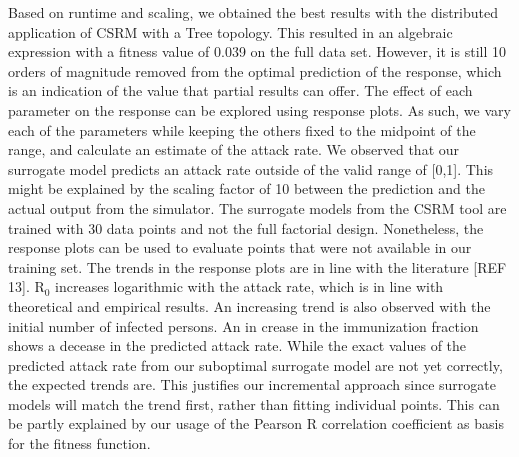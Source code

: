 Based on runtime and scaling, we obtained the best results with the distributed application of CSRM with a Tree topology. This resulted in an algebraic expression with a fitness value of 0.039 on the full data set. However, it is still 10 orders of magnitude removed from the optimal prediction of the response, which is an indication of the value that partial results can offer. 
The effect of each parameter on the response can be explored using response plots. As such, we vary each of the parameters while keeping the others fixed to the midpoint of the range, and calculate an estimate of the attack rate. We observed that our surrogate model predicts an attack rate outside of the valid range of [0,1]. This might be explained by the scaling factor of 10 between the prediction and the actual output from the simulator. The surrogate models from the CSRM tool are trained with 30 data points and not the full factorial design. Nonetheless, the response plots can be used to evaluate points that were not available in our training set. The trends in the response plots are in line with the literature [REF 13].  R$_0$ increases logarithmic with the attack rate, which is in line with theoretical and empirical results. An increasing trend is also observed with the initial number of infected persons. An in crease in the immunization fraction shows a decease in the predicted attack rate. While the exact values of the predicted attack rate from our suboptimal surrogate model are not yet correctly, the expected trends are. This justifies our incremental approach since surrogate models will  match the trend first, rather than fitting individual points. This can be partly explained by our usage of the Pearson R correlation coefficient as basis for the fitness function. 

